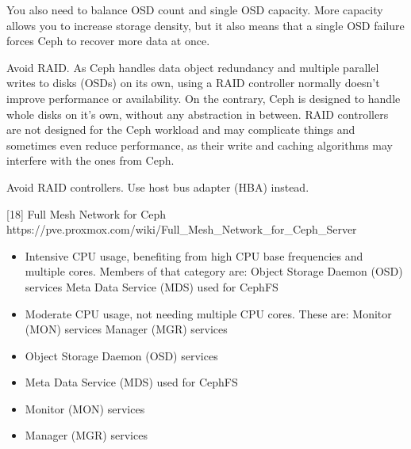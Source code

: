 You also need to balance OSD count and single OSD capacity. More capacity allows you to increase storage density, but it also means that a single OSD failure forces Ceph to recover more data at once.

Avoid RAID. As Ceph handles data object redundancy and multiple parallel writes to disks (OSDs) on its own, using a RAID controller normally doesn’t improve performance or availability. On the contrary, Ceph is designed to handle whole disks on it’s own, without any abstraction in between. RAID controllers are not designed for the Ceph workload and may complicate things and sometimes even reduce performance, as their write and caching algorithms may interfere with the ones from Ceph.

Avoid RAID controllers. Use host bus adapter (HBA) instead.

[18] Full Mesh Network for Ceph https://pve.proxmox.com/wiki/Full_Mesh_Network_for_Ceph_Server

\begin{itemize}[leftmargin=2cm]

	\item Intensive CPU usage, benefiting from high CPU base frequencies and multiple cores. Members of that category are: Object Storage Daemon (OSD) services Meta Data Service (MDS) used for CephFS

	\item Moderate CPU usage, not needing multiple CPU cores. These are: Monitor (MON) services Manager (MGR) services

\end{itemize}

\begin{itemize}[leftmargin=2cm]

	\item Object Storage Daemon (OSD) services

	\item Meta Data Service (MDS) used for CephFS

\end{itemize}

\begin{itemize}[leftmargin=2cm]

	\item Monitor (MON) services

	\item Manager (MGR) services

\end{itemize}

